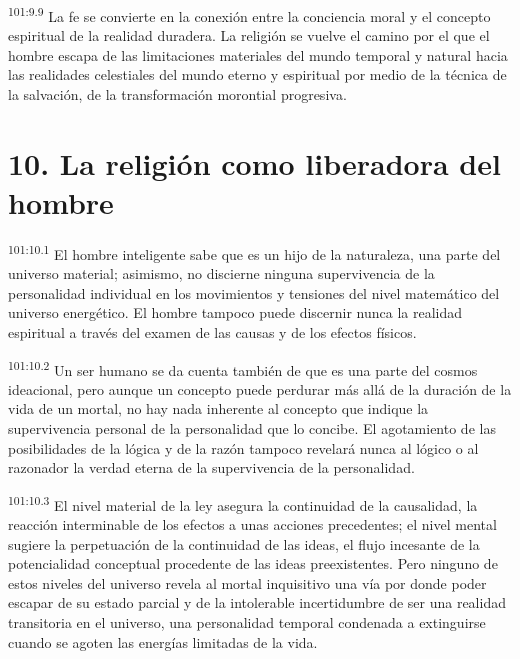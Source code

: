 \documentclass[twoside, 11pt]{book}
\begin{document}
\par
\textsuperscript{101:9.9} La fe se convierte en la conexión entre la conciencia moral y el concepto espiritual de la realidad duradera. La religión se vuelve el camino por el que el hombre escapa de las limitaciones materiales del mundo temporal y natural hacia las realidades celestiales del mundo eterno y espiritual por medio de la técnica de la salvación, de la transformación morontial progresiva.

\section*{10. La religión como liberadora del hombre}
\par
\textsuperscript{101:10.1} El hombre inteligente sabe que es un hijo de la naturaleza, una parte del universo material; asimismo, no discierne ninguna supervivencia de la personalidad individual en los movimientos y tensiones del nivel matemático del universo energético. El hombre tampoco puede discernir nunca la realidad espiritual a través del examen de las causas y de los efectos físicos.

\par
\textsuperscript{101:10.2} Un ser humano se da cuenta también de que es una parte del cosmos ideacional, pero aunque un concepto puede perdurar más allá de la duración de la vida de un mortal, no hay nada inherente al concepto que indique la supervivencia personal de la personalidad que lo concibe. El agotamiento de las posibilidades de la lógica y de la razón tampoco revelará nunca al lógico o al razonador la verdad eterna de la supervivencia de la personalidad.

\par
\textsuperscript{101:10.3} El nivel material de la ley asegura la continuidad de la causalidad, la reacción interminable de los efectos a unas acciones precedentes; el nivel mental sugiere la perpetuación de la continuidad de las ideas, el flujo incesante de la potencialidad conceptual procedente de las ideas preexistentes. Pero ninguno de estos niveles del universo revela al mortal inquisitivo una vía por donde poder escapar de su estado parcial y de la intolerable incertidumbre de ser una realidad transitoria en el universo, una personalidad temporal condenada a extinguirse cuando se agoten las energías limitadas de la vida.
\end{document}

